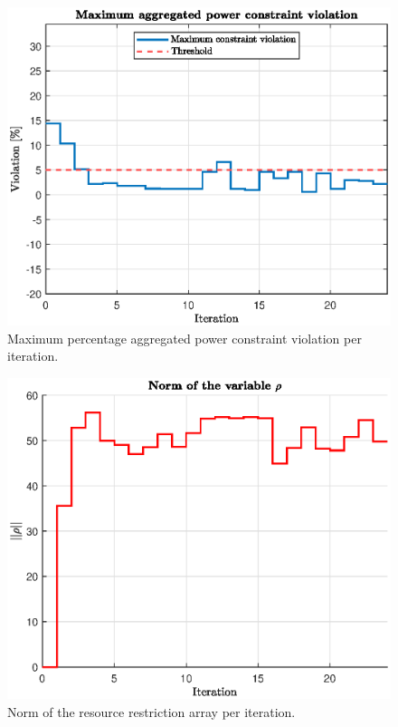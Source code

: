 \begin{figure}[H]
    \centering
    \includegraphics[width=0.9\columnwidth]{assets/violation.eps}
    \caption{Maximum percentage aggregated power constraint violation per iteration. }
    \label{fig:violation}
\end{figure}

\begin{figure}[H]
    \centering
    \includegraphics[width=0.9\columnwidth]{assets/norm_rho.eps}
    \caption{Norm of the resource restriction array per iteration. }
    \label{fig:norm_rho}
\end{figure}

